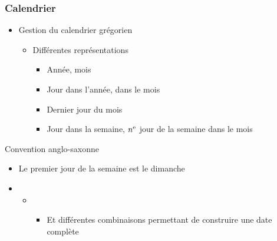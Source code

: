 \documentclass[C++.tex]{subfiles}
\begin{document}
\begin{frame}[fragile]
	\frametitle{Calendrier}
	\begin{itemize}
		\item Gestion du calendrier grégorien
		\begin{itemize}
			\item Différentes représentations
			\begin{itemize}
				\item Année, mois
				\item Jour dans l'année, dans le mois
				\item Dernier jour du mois
				\item Jour dans la semaine, $n\textsuperscript{e}$ jour de la semaine dans le mois
			\end{itemize}
		\end{itemize}
	\end{itemize}

	\begin{alertblock}{Convention anglo-saxonne}
		\begin{itemize}
			\item Le premier jour de la semaine est le dimanche
		\end{itemize}
	\end{alertblock}

	\begin{itemize}
		\item [] \begin{itemize}
			\item [] \begin{itemize}
				\item Et différentes combinaisons permettant de construire une date complète
			\end{itemize}
		\end{itemize}
	\end{itemize}

\end{frame}
\end{document}
